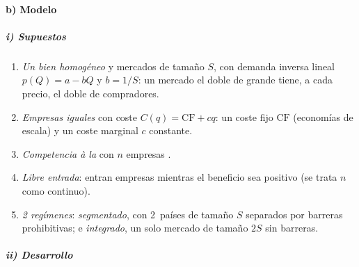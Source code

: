 \documentclass[11pt]{article}
\begin{document}
\paragraph{b) Modelo}

\subparagraph{i) Supuestos}

\begin{enumerate}
\item \emph{Un bien homogéneo} y mercados de tamaño $S$, con demanda inversa lineal $p(Q)=a-bQ$ y $b=1/S$: un mercado el doble de grande tiene, a cada precio, el doble de compradores.
\item \emph{Empresas iguales} con coste $C(q)=\mathrm{CF}+cq$: un coste fijo $\mathrm{CF}$ (economías de escala) y un coste marginal $c$ constante.
\item \emph{Competencia à la } con $n$ empresas .
\item \emph{Libre entrada}: entran empresas mientras el beneficio sea positivo (se trata $n$ como continuo).
\item \emph{2 regímenes}: \emph{segmentado}, con 2~países de tamaño $S$ separados por barreras prohibitivas; e \emph{integrado}, un solo mercado de tamaño $2S$ sin barreras.
\end{enumerate}

\subparagraph{ii) Desarrollo}
\end{document}
